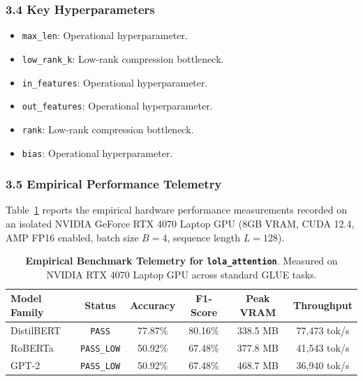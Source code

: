 \subsubsection*{3.4 Key Hyperparameters}
\begin{itemize}
    \item \texttt{max\_len}: Operational hyperparameter.
    \item \texttt{low\_rank\_k}: Low-rank compression bottleneck.
    \item \texttt{in\_features}: Operational hyperparameter.
    \item \texttt{out\_features}: Operational hyperparameter.
    \item \texttt{rank}: Low-rank compression bottleneck.
    \item \texttt{bias}: Operational hyperparameter.
\end{itemize}

\subsubsection*{3.5 Empirical Performance Telemetry}
Table~\ref{tab:telemetry_lola_attention} reports the empirical hardware performance measurements recorded on an isolated NVIDIA GeForce RTX 4070 Laptop GPU (8GB VRAM, CUDA 12.4, AMP FP16 enabled, batch size $B=4$, sequence length $L=128$).

\begin{table}[h]
\centering
\small
\caption{\textbf{Empirical Benchmark Telemetry for \texttt{lola\_attention}}. Measured on NVIDIA RTX 4070 Laptop GPU across standard GLUE tasks.}
\label{tab:telemetry_lola_attention}
\begin{tabular*}{\columnwidth}{@{\extracolsep{\fill}}lccccc}
\toprule
\textbf{Model Family} & \textbf{Status} & \textbf{Accuracy} & \textbf{F1-Score} & \textbf{Peak VRAM} & \textbf{Throughput} \\
\midrule
DistilBERT & \texttt{PASS} & 77.87\% & 80.16\% & 338.5 MB & 77,473 tok/s \\
RoBERTa & \texttt{PASS\_LOW} & 50.92\% & 67.48\% & 377.8 MB & 41,543 tok/s \\
GPT-2 & \texttt{PASS\_LOW} & 50.92\% & 67.48\% & 468.7 MB & 36,940 tok/s \\
\bottomrule
\end{tabular*}
\end{table}

